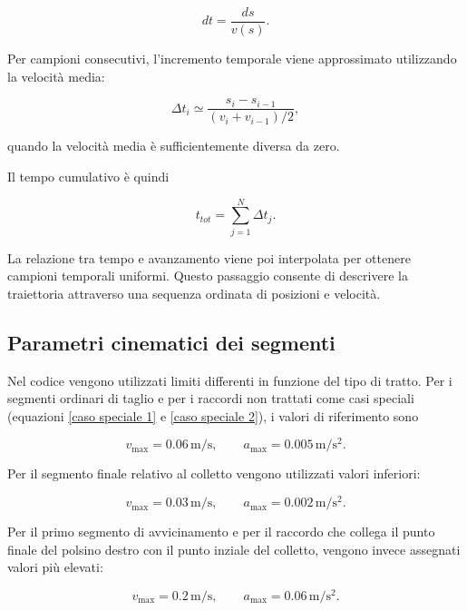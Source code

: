 \begin{equation}
    dt=\frac{ds}{v(s)}.
\end{equation}

Per campioni consecutivi, l'incremento temporale viene approssimato utilizzando la velocità media:

\begin{equation}
    \Delta t_i \simeq
    \frac{s_i-s_{i-1}}
    {\left(v_i+v_{i-1}\right)/2},
    \label{eq:incremento_temporale}
\end{equation}

quando la velocità media è sufficientemente diversa da zero.

Il tempo cumulativo è quindi

\begin{equation}
    t_{tot}=\sum_{j=1}^{N}\Delta t_j.
\end{equation}

La relazione tra tempo e avanzamento viene poi interpolata per ottenere campioni temporali uniformi. Questo passaggio consente di descrivere la traiettoria attraverso una sequenza ordinata di posizioni e velocità.

\subsection{Parametri cinematici dei segmenti}

Nel codice vengono utilizzati limiti differenti in funzione del tipo di tratto. Per i segmenti ordinari di taglio e per i raccordi non trattati come casi speciali (equazioni \eqref{caso speciale 1} e \eqref{caso speciale 2}), i valori di riferimento sono

\begin{equation}
    v_{\max}=0.06\,\mathrm{m/s},
    \qquad
    a_{\max}=0.005\,\mathrm{m/s^2}.
\end{equation}

Per il segmento finale relativo al colletto vengono utilizzati valori inferiori:

\begin{equation}
    v_{\max}=0.03\,\mathrm{m/s},
    \qquad
    a_{\max}=0.002\,\mathrm{m/s^2}.
    \label{caso speciale 1}
\end{equation}

Per il primo segmento di avvicinamento e per il raccordo che collega il punto finale del polsino destro con il punto inziale del colletto, vengono invece assegnati valori più elevati:

\begin{equation}
    v_{\max}=0.2\,\mathrm{m/s},
    \qquad
    a_{\max}=0.06\,\mathrm{m/s^2}.
    \label{caso speciale 2}
\end{equation}

